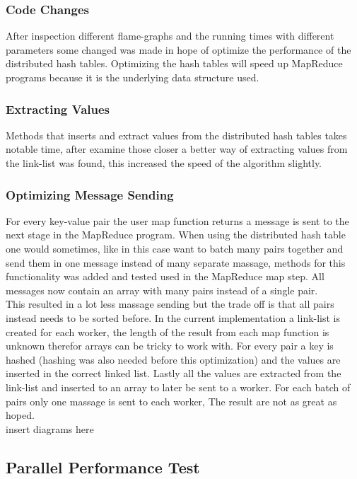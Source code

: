 \subsubsection{Code Changes}
After inspection different flame-graphs and the running times with different parameters some changed was made in hope of optimize the performance of the distributed hash tables. Optimizing the hash tables will speed up MapReduce programs because it is the underlying data structure used.

\subsubsection{Extracting Values}
Methods that inserts and extract values from the distributed hash tables takes notable time, after examine those closer a better way of extracting values from the link-list was found, this increased the speed of the algorithm slightly.

\subsubsection{Optimizing Message Sending}
For every key-value pair the user map function returns a message is sent to the next stage in the MapReduce program. When using the distributed hash table one would sometimes, like in this case want to batch many pairs together and send them in one message instead of many separate massage, methods for this functionality was added and tested used in the MapReduce map step. All messages now contain an array with many pairs instead of a single pair. \\

This resulted in a lot less massage sending but the trade off is that all pairs instead needs to be sorted before. In the current implementation a link-list is created for each worker, the length of the result from each map function is unknown therefor arrays can be tricky to work with. For every pair a key is hashed (hashing was also needed before this optimization) and the values are inserted in the correct linked list. Lastly all the values are extracted from the link-list and inserted to an array to later be sent to a worker. For each batch of pairs only one massage is sent to each worker, The result are not as great as hoped. \\ insert diagrams here

\subsection{Parallel Performance Test}

